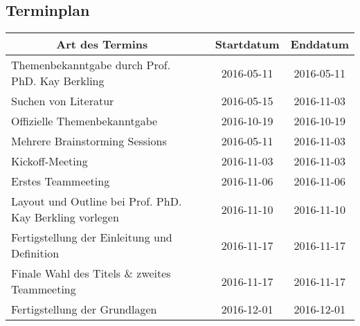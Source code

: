 \subsection{Terminplan}
\begin{tabular}{|p{6cm}|p{3.5cm}|c|c|}
\hline
\multicolumn{1}{|c|}{\textbf{Art des Termins}}               & \centering{\textbf{Teilnehmer}}                                  &              \textbf{Startdatum} & \textbf{Enddatum} \\ \hline
Themenbekanntgabe durch Prof. PhD. Kay Berkling              & \centering{Kay Berkling, Marc Mahler}                            & 2016-05-11          & 2016-05-11        \\ \hline
Suchen von Literatur                                         & \centering{Marvin Zerulla}                                       & 2016-05-15          & 2016-11-03        \\ \hline
Offizielle Themenbekanntgabe                                 & \centering{Marc Mahler, Marvin Zerulla}                          & 2016-10-19          & 2016-10-19        \\ \hline
Mehrere Brainstorming  Sessions                              & \centering{Marc Mahler, Marvin Zerulla}                          & 2016-05-11          & 2016-11-03        \\ \hline
Kickoff-Meeting                                              & \centering{Marc Mahler, Marvin Zerulla, Prof. PhD. Kay Berkling} & 2016-11-03          & 2016-11-03        \\ \hline
Erstes Teammeeting                                           & \centering{Marc Mahler, Marvin Zerulla}                          & 2016-11-06          & 2016-11-06        \\ \hline
Layout und Outline bei Prof. PhD. Kay Berkling vorlegen      & \centering{Marc Mahler, Marvin Zerulla, Prof. PhD. Kay Berkling} & 2016-11-10          & 2016-11-10        \\ \hline
Fertigstellung der  Einleitung und  Definition               & \centering{Marc Mahler, Marvin Zerulla}                          & 2016-11-17          & 2016-11-17        \\ \hline
Finale Wahl des Titels \& zweites Teammeeting				 & \centering{Marc Mahler, Marvin Zerulla}							&
2016-11-17 			& 2016-11-17		\\ \hline
Fertigstellung der Grundlagen                                & \centering{Marc Mahler, Marvin Zerulla}                          & 2016-12-01          & 2016-12-01        \\ \hline
\end{tabular}

